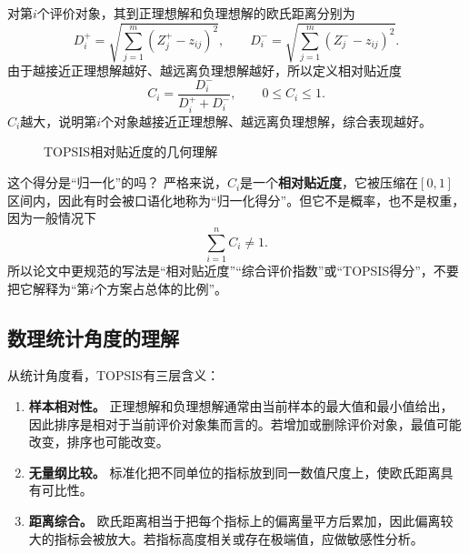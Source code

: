 \documentclass[UTF8,a4paper,12pt,fontset=none]{ctexart}
\begin{document}
对第$i$个评价对象，其到正理想解和负理想解的欧氏距离分别为
\[
D_i^+=\sqrt{\sum_{j=1}^{m}(Z_j^+-z_{ij})^2},\qquad
D_i^-=\sqrt{\sum_{j=1}^{m}(Z_j^--z_{ij})^2}.
\]
由于越接近正理想解越好、越远离负理想解越好，所以定义相对贴近度
\[
C_i=\frac{D_i^-}{D_i^++D_i^-},\qquad 0\le C_i\le 1.
\]
$C_i$越大，说明第$i$个对象越接近正理想解、越远离负理想解，综合表现越好。

\begin{figure}[H]
\centering
{}
\caption{TOPSIS相对贴近度的几何理解}
\end{figure}

\begin{warnbox}{这个得分是“归一化”的吗？}
严格来说，$C_i$是一个\textbf{相对贴近度}，它被压缩在$[0,1]$区间内，因此有时会被口语化地称为“归一化得分”。但它不是概率，也不是权重，因为一般情况下
\[
\sum_{i=1}^n C_i\ne 1.
\]
所以论文中更规范的写法是“相对贴近度”“综合评价指数”或“TOPSIS得分”，不要把它解释为“第$i$个方案占总体的比例”。
\end{warnbox}

\subsection{数理统计角度的理解}
从统计角度看，TOPSIS有三层含义：
\begin{enumerate}[leftmargin=2em]
  \item \textbf{样本相对性。} 正理想解和负理想解通常由当前样本的最大值和最小值给出，因此排序是相对于当前评价对象集而言的。若增加或删除评价对象，最值可能改变，排序也可能改变。
  \item \textbf{无量纲比较。} 标准化把不同单位的指标放到同一数值尺度上，使欧氏距离具有可比性。
  \item \textbf{距离综合。} 欧氏距离相当于把每个指标上的偏离量平方后累加，因此偏离较大的指标会被放大。若指标高度相关或存在极端值，应做敏感性分析。
\end{enumerate}
\end{document}
